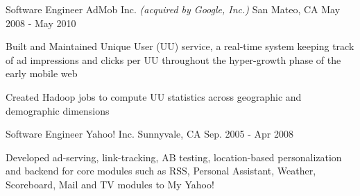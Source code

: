 \begin{cventries}
  \cventry
    {Software Engineer} %
    {AdMob Inc. \bodyfontlight\emph{(acquired by Google, Inc.)}} %
    {San Mateo, CA} %
    {May 2008 - May 2010} %
    {
      \begin{cvitems} %
        \item{Built and Maintained Unique User (UU) service, a real-time system keeping track of ad impressions and clicks per UU throughout the hyper-growth phase of the early mobile web}
        \item{Created Hadoop jobs to compute UU statistics across geographic and demographic dimensions}
      \end{cvitems}
    }

  \cventry
    {Software Engineer} %
    {Yahoo! Inc.} %
    {Sunnyvale, CA} %
    {Sep. 2005 - Apr 2008} %
    {
      \begin{cvitems} %
        \item{Developed ad-serving, link-tracking, AB testing, location-based personalization and backend for core modules such as RSS, Personal Assistant, Weather, Scoreboard, Mail and TV modules to My Yahoo!}
      \end{cvitems}
    }

\end{cventries}
